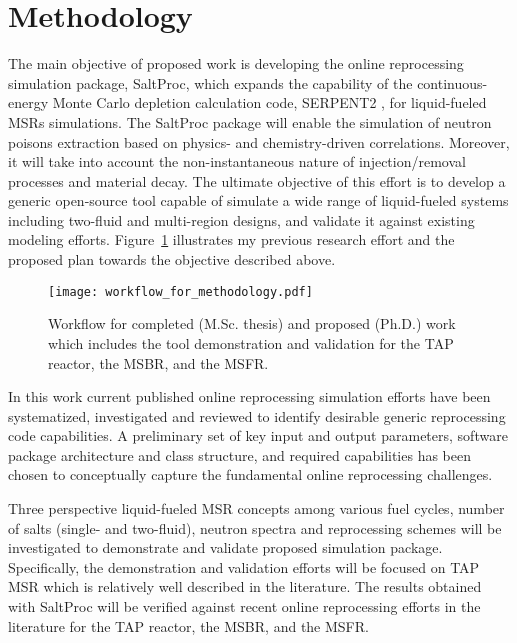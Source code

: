 \section{Methodology}
The main objective of proposed work is developing the online 
reprocessing simulation package, SaltProc, which expands the 
capability of the continuous-energy Monte Carlo depletion 
calculation code, SERPENT2 \cite{leppanen_serpent_2015}, for 
liquid-fueled \glspl{MSR} simulations. The SaltProc package 
will enable the simulation of neutron poisons extraction 
based on physics- and chemistry-driven correlations. 
Moreover, it will take into account the non-instantaneous 
nature of injection/removal processes and material decay. 
The ultimate objective of this effort is to develop a generic 
open-source tool capable of simulate a wide range of 
liquid-fueled systems including two-fluid and multi-region 
designs, and validate it against existing modeling efforts. 
Figure~\ref{fig:workflow_method} illustrates my previous 
research effort and the proposed plan towards the objective 
described above.
\begin{figure}[htp!] %
  \centering
	\texttt{[image: workflow\_for\_methodology.pdf]}
  \caption{Workflow for completed (M.Sc. thesis) and proposed (Ph.D.) work 
  which includes the tool demonstration and validation for the \gls{TAP} 
  reactor, the \gls{MSBR}, and the \gls{MSFR}.}
  \label{fig:workflow_method}
\end{figure}

In this work current published online reprocessing simulation efforts 
have been systematized, investigated and reviewed to identify desirable 
generic reprocessing code capabilities. A preliminary set of key input 
and output parameters, software package architecture and class 
structure, and required capabilities has been chosen to conceptually 
capture the fundamental online reprocessing challenges. 

Three perspective liquid-fueled \gls{MSR} concepts among various 
fuel cycles, number of salts (single- and two-fluid), neutron 
spectra and reprocessing schemes will be investigated to 
demonstrate and validate proposed simulation package. Specifically, 
the demonstration and validation efforts will be focused on \gls{TAP} 
\gls{MSR} which is relatively well described in the literature. 
The results obtained with SaltProc will be verified against 
recent online reprocessing efforts in the literature for the 
\gls{TAP} reactor, the \gls{MSBR}, and the \gls{MSFR}. 